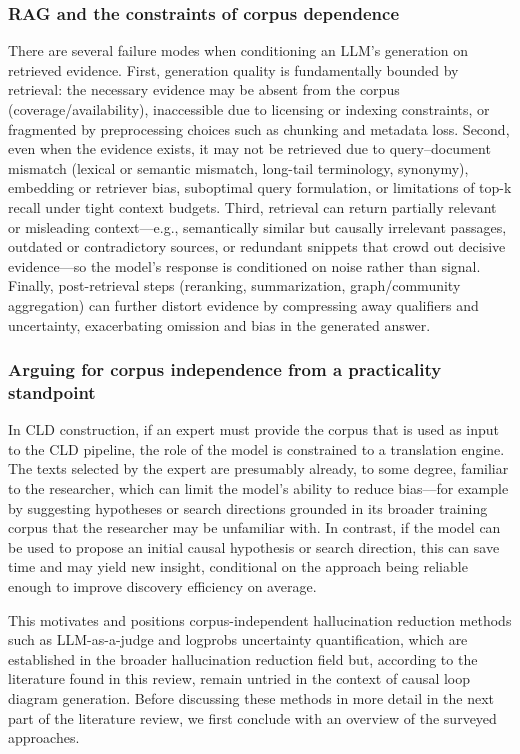 \subsubsection{RAG and the constraints of corpus dependence}
There are several failure modes when conditioning an LLM's generation on retrieved evidence. First, generation quality is fundamentally bounded by retrieval: the necessary evidence may be absent from the corpus (coverage/availability), inaccessible due to licensing or indexing constraints, or fragmented by preprocessing choices such as chunking and metadata loss. Second, even when the evidence exists, it may not be retrieved due to query--document mismatch (lexical or semantic mismatch, long-tail terminology, synonymy), embedding or retriever bias, suboptimal query formulation, or limitations of top-k recall under tight context budgets. Third, retrieval can return partially relevant or misleading context---e.g., semantically similar but causally irrelevant passages, outdated or contradictory sources, or redundant snippets that crowd out decisive evidence---so the model's response is conditioned on noise rather than signal. Finally, post-retrieval steps (reranking, summarization, graph/community aggregation) can further distort evidence by compressing away qualifiers and uncertainty, exacerbating omission and bias in the generated answer.

\subsubsection{Arguing for corpus independence from a practicality standpoint}
In CLD construction, if an expert must provide the corpus that is used as input to the CLD pipeline, the role of the model is constrained to a translation engine. The texts selected by the expert are presumably already, to some degree, familiar to the researcher, which can limit the model's ability to reduce bias---for example by suggesting hypotheses or search directions grounded in its broader training corpus that the researcher may be unfamiliar with. In contrast, if the model can be used to propose an initial causal hypothesis or search direction, this can save time and may yield new insight, conditional on the approach being reliable enough to improve discovery efficiency on average.

This motivates and positions corpus-independent hallucination reduction methods such as LLM-as-a-judge and logprobs uncertainty quantification, which are established in the broader hallucination reduction field but, according to the literature found in this review, remain untried in the context of causal loop diagram generation. Before discussing these methods in more detail in the next part of the literature review, we first conclude with an overview of the surveyed approaches.

